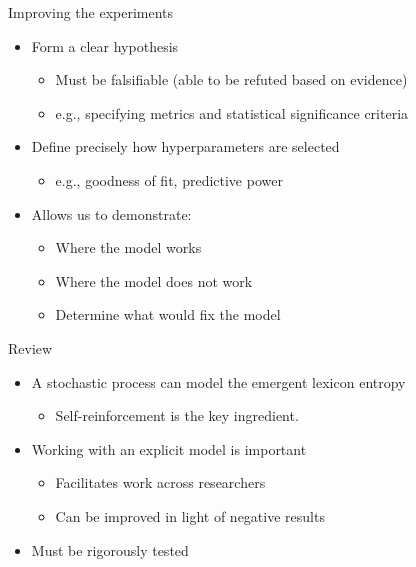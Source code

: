 \documentclass{beamer}
\begin{document}
\begin{frame}{Improving the experiments}
    \begin{itemize}
        \item Form a clear hypothesis
            \begin{itemize}
                \item Must be falsifiable (able to be refuted based on evidence)
                \item e.g., specifying metrics and statistical significance criteria
            \end{itemize}
        \item Define precisely how hyperparameters are selected
            \begin{itemize}
                \item e.g., goodness of fit, predictive power
            \end{itemize}
        \item Allows us to demonstrate:
            \begin{itemize}
                \item Where the model works
                \item Where the model does not work
                \item Determine what would fix the model
            \end{itemize}
    \end{itemize}
\end{frame}

\begin{frame}{Review}
    \begin{itemize}
        \item A stochastic process can model the emergent lexicon entropy
            \begin{itemize}
                \item Self-reinforcement is the key ingredient.
            \end{itemize}
        \item Working with an explicit model is important
            \begin{itemize}
                \item Facilitates work across researchers
                \item Can be improved in light of negative results
            \end{itemize}
        \item Must be rigorously tested
    \end{itemize}
\end{frame}
\end{document}
